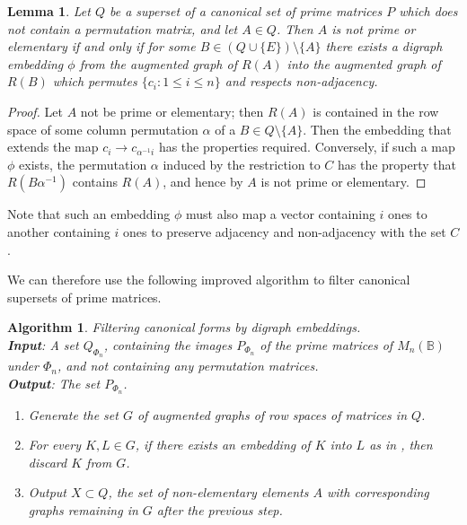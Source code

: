 \documentclass[11pt]{article}
\newtheorem{lemma}[thm]{Lemma}
\newtheorem{algo}[thm]{Algorithm}
\newenvironment{alg}{\begin{algo}\rm}{\end{algo}}
\numberwithin{equation}{section}
\renewcommand{\to}{\longrightarrow}
\newcommand{\B}{\mathbb{B}}
\newcommand{\Bn}{M_n(\B)}
\begin{document}
\begin{lemma}
  Let $Q$ be a superset of a canonical set of prime matrices $P$ which does not
  contain a permutation matrix, and let $A \in
  Q$. Then $A$ is not prime or elementary if and only if for some $B \in
  (Q\cup\{E\})\setminus\{A\}$ there exists a digraph embedding
  $\phi$ from the augmented graph of $R(A)$ into the augmented graph of $R(B)$
  which permutes $\{ c_i : 1 \leq i \leq n \}$ and respects non-adjacency.
\end{lemma}
\begin{proof}
  Let $A$ not be prime or elementary; then $R(A)$ is contained in the row space
  of some column permutation $\alpha$ of a $B \in Q \setminus \{A\}$.
  Then the embedding that extends the map $c_i \to c_{\alpha^{-1}i}$ has the
  properties required. Conversely, if such a map $\phi$ exists, the permutation
  $\alpha$ induced by the restriction to $C$ has the property that
  $R(B\alpha^{-1})$ contains $R(A)$, and hence by 
  $A$ is not prime or elementary. 
\end{proof}

Note that such an embedding $\phi$ must also map a vector containing $i$ ones to
another containing $i$ ones to preserve adjacency and non-adjacency with the set
$C$.

We can therefore use the following improved algorithm to filter canonical
supersets of prime matrices.

\begin{alg}
   Filtering canonical forms by digraph embeddings.\\
  \textbf{Input}: A set $Q_{\Phi_n}$, containing the images $P_{\Phi_n}$ of the
  prime matrices of $\Bn$ under $\Phi_n$, and not containing any permutation
  matrices. \\
  \textbf{Output}: The set $P_{\Phi_n}$.
  \begin{enumerate}
  \item
    Generate the set $G$ of augmented graphs of row spaces of matrices in $Q$.
  \item 
    For every $K, L \in G$, if there exists an embedding of $K$ into $L$ as in
    , then discard $K$ from $G$.
  \item
    Output $X\subset Q$, the set of non-elementary elements $A$ with
    corresponding graphs remaining in $G$ after the previous step.
\end{enumerate}
\end{alg}
\end{document}
